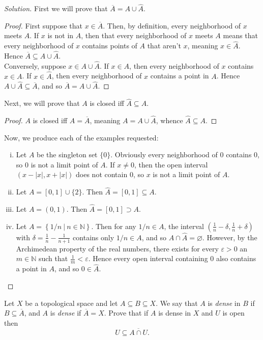 \documentclass[12pt]{article}
\newenvironment{problem}[2][Problem]{\begin{trivlist}
\item[\hskip \labelsep {\bfseries #1}\hskip \labelsep {\bfseries #2.}]}{\end{trivlist}}
\newenvironment{solution}
  {\renewcommand\qedsymbol{$\blacksquare$}\begin{proof}[Solution]}
{\end{proof}}
\newenvironment{sproof}{
  \renewcommand\qedsymbol{$\square$}
  \begin{proof}
  }{
  \end{proof}
}
\begin{document}
\begin{solution}
  First we will prove that $\overline{A}=A\cup\widehat{A}$.
  \begin{sproof}
    First suppose that $x\in\overline{A}$.
    Then, by definition, every neighborhood of $x$ meets $A$.
    If $x$ is not in $A$, then that every neighborhood of $x$ meets $A$ means that every neighborhood of
    $x$ contains points of $A$ that aren't $x$, meaning $x\in\widehat{A}$.
    Hence $\overline{A}\subseteq A\cup\widehat{A}$.\\\indent
    Conversely, suppose $x\in A\cup\widehat{A}$.
    If $x\in A$, then every neighborhood of $x$ contains $x\in A$.
    If $x\in \widehat{A}$, then every neighborhood of $x$ contains a point in $A$.
    Hence $A\cup\widehat{A}\subseteq \overline{A}$, and so $\overline{A} = A\cup\widehat{A}$.
  \end{sproof}
  Next, we will prove that $A$ is closed iff $\widehat{A}\subseteq A$.
  \begin{sproof}
    $A$ is closed iff $A=\overline{A}$, meaning $A=A\cup\widehat{A}$, whence $\widehat{A}\subseteq{A}$.
  \end{sproof}
  Now, we produce each of the examples requested:
  \begin{enumerate}[(i)]
    \item Let $A$ be the singleton set $\{0\}$.
      Obviously every neighborhood of 0 contains 0, so 0 is not a limit point of $A$.
      If $x\neq0$, then the open interval $(x-|x|, x+|x|)$ does not contain $0$, 
      so $x$ is not a limit point of $A$.

    \item Let $A = [0, 1] \cup \{2\}$.
      Then $\widehat{A} = [0,1]\subseteq A$.

    \item Let $A=(0,1)$. 
      Then $\widehat{A}=[0,1]\supset A$.

    \item Let $A = \left\{ 1/n\  |\  n\in\mathbb{N} \right\}$.
      Then for any $1/n\in A$, the interval $\left(\frac{1}{n}-\delta,\frac{1}{n}+\delta\right)$ 
      with $\delta=\frac{1}{n} - \frac{1}{n+1}$ contains only $1/n\in A$, 
      and so $A\cap\widehat{A}=\varnothing.$
      However, by the Archimedean property of the real numbers, there exists for every 
      $\varepsilon>0$ an $m\in\mathbb{N}$ such that $\frac{1}{m} < \varepsilon$.
      Hence every open interval containing $0$ also contains a point in $A$, and so $0\in\widehat{A}$. 
  \end{enumerate}
\end{solution}

\begin{problem}{4}
  Let $X$ be a topological space and let $A\subseteq B\subseteq X$.
  We say that $A$ is \textit{dense} in $B$ if $B\subseteq\overline{A}$, 
  and $A$ is \textit{dense} if $\overline{A}=X$.
  Prove that if $A$ is dense in $X$ and $U$ is open then 
  $$U\subseteq \overline{A\cap U}.$$
\end{problem}<++>
\end{document}

